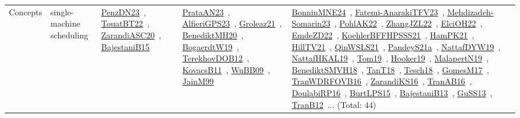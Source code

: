 {\begin{longtable}{lp{3cm}>{\raggedright\arraybackslash}p{6cm}>{\raggedright\arraybackslash}p{6cm}>{\raggedright\arraybackslash}p{8cm}}
Concepts & single-machine scheduling & \href{../works/PenzDN23.pdf}{PenzDN23}~\cite{PenzDN23}, \href{../works/TouatBT22.pdf}{TouatBT22}~\cite{TouatBT22}, \href{../works/ZarandiASC20.pdf}{ZarandiASC20}~\cite{ZarandiASC20}, \href{../works/BajestaniB15.pdf}{BajestaniB15}~\cite{BajestaniB15} & \href{../works/PrataAN23.pdf}{PrataAN23}~\cite{PrataAN23}, \href{../works/AlfieriGPS23.pdf}{AlfieriGPS23}~\cite{AlfieriGPS23}, \href{../works/Groleaz21.pdf}{Groleaz21}~\cite{Groleaz21}, \href{../works/BenediktMH20.pdf}{BenediktMH20}~\cite{BenediktMH20}, \href{../works/BogaerdtW19.pdf}{BogaerdtW19}~\cite{BogaerdtW19}, \href{../works/TerekhovDOB12.pdf}{TerekhovDOB12}~\cite{TerekhovDOB12}, \href{../works/KovacsB11.pdf}{KovacsB11}~\cite{KovacsB11}, \href{../works/WuBB09.pdf}{WuBB09}~\cite{WuBB09}, \href{../works/JainM99.pdf}{JainM99}~\cite{JainM99} & \href{../works/BonninMNE24.pdf}{BonninMNE24}~\cite{BonninMNE24}, \href{../works/Fatemi-AnarakiTFV23.pdf}{Fatemi-AnarakiTFV23}~\cite{Fatemi-AnarakiTFV23}, \href{../works/Mehdizadeh-Somarin23.pdf}{Mehdizadeh-Somarin23}~\cite{Mehdizadeh-Somarin23}, \href{../works/PohlAK22.pdf}{PohlAK22}~\cite{PohlAK22}, \href{../works/ZhangJZL22.pdf}{ZhangJZL22}~\cite{ZhangJZL22}, \href{../works/ElciOH22.pdf}{ElciOH22}~\cite{ElciOH22}, \href{../works/EmdeZD22.pdf}{EmdeZD22}~\cite{EmdeZD22}, \href{../works/KoehlerBFFHPSSS21.pdf}{KoehlerBFFHPSSS21}~\cite{KoehlerBFFHPSSS21}, \href{../works/HamPK21.pdf}{HamPK21}~\cite{HamPK21}, \href{../works/HillTV21.pdf}{HillTV21}~\cite{HillTV21}, \href{../works/QinWSLS21.pdf}{QinWSLS21}~\cite{QinWSLS21}, \href{../works/PandeyS21a.pdf}{PandeyS21a}~\cite{PandeyS21a}, \href{../works/NattafDYW19.pdf}{NattafDYW19}~\cite{NattafDYW19}, \href{../works/NattafHKAL19.pdf}{NattafHKAL19}~\cite{NattafHKAL19}, \href{../works/Tom19.pdf}{Tom19}~\cite{Tom19}, \href{../works/Hooker19.pdf}{Hooker19}~\cite{Hooker19}, \href{../works/MalapertN19.pdf}{MalapertN19}~\cite{MalapertN19}, \href{../works/BenediktSMVH18.pdf}{BenediktSMVH18}~\cite{BenediktSMVH18}, \href{../works/TanT18.pdf}{TanT18}~\cite{TanT18}, \href{../works/Tesch18.pdf}{Tesch18}~\cite{Tesch18}, \href{../works/GomesM17.pdf}{GomesM17}~\cite{GomesM17}, \href{../works/TranWDRFOVB16.pdf}{TranWDRFOVB16}~\cite{TranWDRFOVB16}, \href{../works/ZarandiKS16.pdf}{ZarandiKS16}~\cite{ZarandiKS16}, \href{../works/TranAB16.pdf}{TranAB16}~\cite{TranAB16}, \href{../works/DoulabiRP16.pdf}{DoulabiRP16}~\cite{DoulabiRP16}, \href{../works/BurtLPS15.pdf}{BurtLPS15}~\cite{BurtLPS15}, \href{../works/BajestaniB13.pdf}{BajestaniB13}~\cite{BajestaniB13}, \href{../works/GuSS13.pdf}{GuSS13}~\cite{GuSS13}, \href{../works/TranB12.pdf}{TranB12}~\cite{TranB12}... (Total: 44)\\

\end{longtable}}
